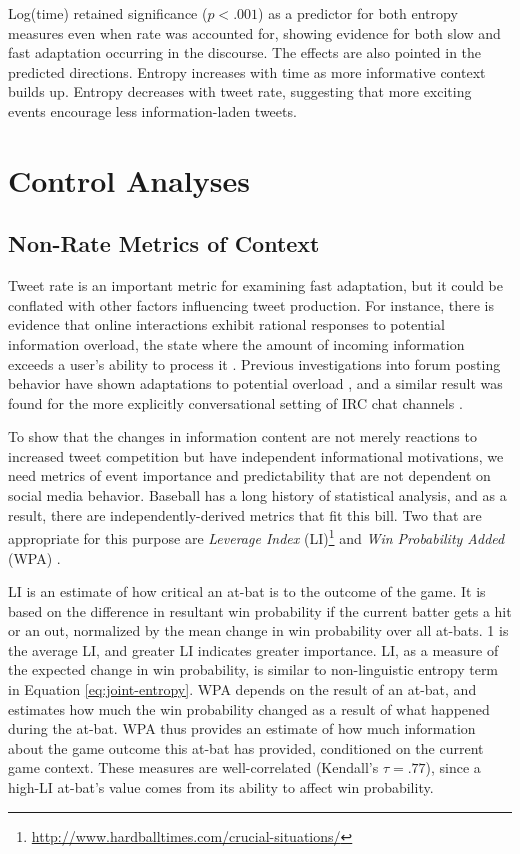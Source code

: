 \documentclass[11pt,letterpaper]{article}
\begin{document}
Log(time) retained significance ($p<.001$) as a predictor for both entropy measures even when rate was accounted for, showing evidence for both slow and fast adaptation occurring in the discourse.  The effects are also pointed in the predicted directions.  Entropy increases with time as more informative context builds up. Entropy decreases with tweet rate, suggesting that more exciting events encourage less information-laden tweets.

\section{Control Analyses}

\subsection{Non-Rate Metrics of Context}\label{sect:other-metrics}
Tweet rate is an important metric for examining fast adaptation, but it could be conflated with other factors influencing tweet production.  For instance, there is evidence that online interactions exhibit rational responses to potential information overload, the state where the amount of incoming information exceeds a user's ability to process it \cite{miller1956,schoberth2003}.  Previous investigations into forum posting behavior have shown adaptations to potential overload \cite{jones2001a,jones2001b,whittaker2003,schoberth2003}, and a similar result was found for the more explicitly conversational setting of IRC chat channels \cite{jones2008}.   

To show that the changes in information content are not merely reactions to increased tweet competition but have independent informational motivations, we need metrics of event importance and predictability that are not dependent on social media behavior.  Baseball has a long history of statistical analysis, and as a result, there are independently-derived metrics that fit this bill.  Two that are appropriate for this purpose are {\it Leverage Index} (LI)\footnote{\url{http://www.hardballtimes.com/crucial-situations/}} and  {\it Win Probability Added} (WPA) \cite{tango2006}.

LI is an estimate of how critical an at-bat is to the outcome of the game.  It is based on the difference in resultant win probability if the current batter gets a hit or an out, normalized by the mean change in win probability over all at-bats. 1 is the average LI, and greater LI indicates greater importance.  LI, as a measure of the expected change in win probability, is similar to non-linguistic entropy term in Equation \ref{eq:joint-entropy}.  WPA depends on the result of an at-bat, and estimates how much the win probability changed as a result of what happened during the at-bat.  WPA thus provides an estimate of how much information about the game outcome this at-bat has provided, conditioned on the current game context.  These measures are well-correlated (Kendall's $\tau=.77$), since a high-LI at-bat's value comes from its ability to affect win probability.
\end{document}
